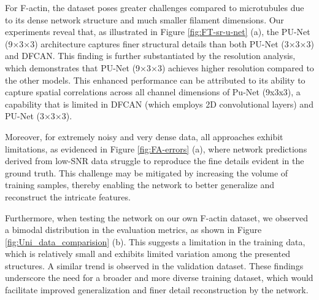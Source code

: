 \documentclass[11pt,
  paper=a4, 
  bibliography=totocnumbered,
	captions=tableheading,
	BCOR=10mm
]{scrreprt}
\theoremstyle{definition}
\newcommand{\figureref}[1]{Figure \ref{#1}}
\begin{document}
For F-actin, the dataset poses greater challenges compared to microtubules due to its dense network structure and much smaller filament dimensions. Our experiments reveal that, as illustrated in \figureref{fig:FT-sr-u-net} (a),
 the PU-Net (9×3×3) architecture captures finer structural details than both PU-Net (3×3×3) and DFCAN. This finding is further substantiated by the resolution analysis, which demonstrates that PU-Net (9×3×3) 
 achieves higher resolution compared to the other models. This enhanced performance can be attributed to its ability to capture spatial correlations across all channel dimensions of Pu-Net (9x3x3), a capability that is limited 
 in DFCAN (which employs 2D convolutional layers) and PU-Net (3×3×3).

\vspace{1cm}
\noindent
Moreover, for extremely noisy and very dense data, all approaches exhibit limitations, as evidenced in \figureref{fig:FA-errors} (a), 
where network predictions derived from low-SNR data struggle to reproduce the fine details evident in the ground truth. 
This challenge may be mitigated by increasing the volume of training samples, thereby enabling the network to better generalize and reconstruct the intricate features.

\vspace{1cm}
\noindent
Furthermore, when testing the network on our own F-actin dataset, we observed a bimodal distribution in the evaluation metrics, as shown in \figureref{fig:Uni_data_comparision} (b). This suggests a limitation in the training data, which is relatively small and exhibits 
limited variation among the presented structures. A similar trend is observed in the validation dataset. These findings underscore the need for a broader 
and more diverse training dataset, which would facilitate improved generalization and finer detail reconstruction by the network.
\end{document}
